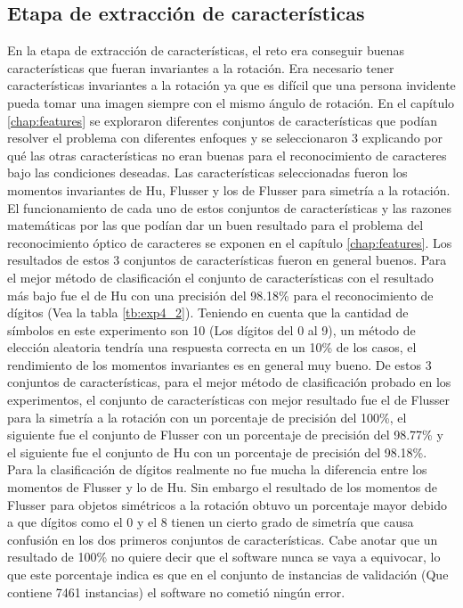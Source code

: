 \documentclass[a4paper, 11pt, oneside]{report}
\begin{document}
\subsection{Etapa de extracción de características}
En la etapa de extracción de características, el reto era conseguir buenas características que fueran invariantes a la rotación. Era necesario tener características invariantes a la rotación ya que es difícil que una persona invidente pueda tomar una imagen siempre con el mismo ángulo de rotación. En el capítulo \ref{chap:features} se exploraron diferentes conjuntos de características que podían resolver el problema con diferentes enfoques y se seleccionaron 3 explicando por qué las otras características no eran buenas para el reconocimiento de caracteres bajo las condiciones deseadas. 
Las características seleccionadas fueron los momentos invariantes de Hu, Flusser y los de Flusser para simetría a la rotación. El funcionamiento de cada uno de estos conjuntos de características y las razones matemáticas por las que podían dar un buen resultado para el problema del reconocimiento óptico de caracteres se exponen en el capítulo \ref{chap:features}.
Los resultados de estos 3 conjuntos de características fueron en general buenos. Para el mejor método de clasificación el conjunto de características con el resultado más bajo fue el de Hu con una precisión del 98.18\% para el reconocimiento de dígitos (Vea la tabla \ref{tb:exp4_2}). Teniendo en cuenta que la cantidad de símbolos en este experimento son 10 (Los dígitos del 0 al 9), un método de elección aleatoria tendría una respuesta correcta en un 10\% de los casos, el rendimiento de los momentos invariantes es en general muy bueno.
De estos 3 conjuntos de características, para el mejor método de clasificación probado en los experimentos, el conjunto de características con mejor resultado fue el de Flusser para la simetría a la rotación con un porcentaje de precisión del 100\%, el siguiente fue el conjunto de Flusser con un porcentaje de precisión del 98.77\% y el siguiente fue el conjunto de Hu con un porcentaje de precisión del 98.18\%. Para la clasificación de dígitos realmente no fue mucha la diferencia entre los momentos de Flusser y lo de Hu. Sin embargo el resultado de los momentos de Flusser para objetos simétricos a la rotación obtuvo un porcentaje mayor debido a que dígitos como el 0 y el 8 tienen un cierto grado de simetría que causa confusión en los dos primeros conjuntos de características. Cabe anotar que un resultado de 100\% no quiere decir que el software nunca se vaya a equivocar, lo que este porcentaje indica es que en el conjunto de instancias de validación (Que contiene 7461 instancias) el software no cometió ningún error. 
\end{document}

